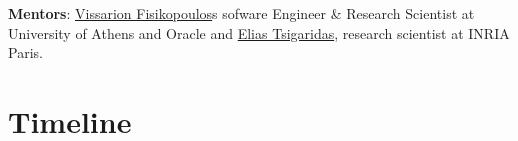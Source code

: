 \documentclass[a4paper, 12pt]{article}
\def\R{{\tt R}}
\begin{document}

\textbf{Mentors}: \textcolor{blue}{\href{https://vissarion.github.io/}{Vissarion Fisikopoulos}}s sofware Engineer \& Research Scientist at University of Athens and Oracle and %
\textcolor{blue}{\href{https://who.paris.inria.fr/Elias.Tsigaridas/}{Elias Tsigaridas}}, research scientist at INRIA Paris.%

\section{Timeline}
\end{document}
